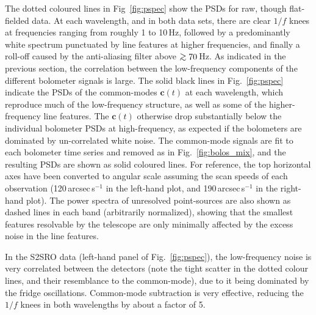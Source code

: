 \documentclass[useAMS,usenatbib,nofootinbib]{mn2e}
\def\gsim{\mathrel{\lower2.5pt\vbox{\lineskip=0pt\baselineskip=0pt
          \hbox{$>$}\hbox{$\sim$}}}}
\begin{document}
The dotted coloured lines in Fig~\ref{fig:pspec} show the PSDs for
raw, though flat-fielded data. At each wavelength, and in both data
sets, there are clear $1/f$ knees at frequencies ranging from roughly
1 to 10\,Hz, followed by a predominantly white spectrum punctuated by
line features at higher frequencies, and finally a roll-off caused by
the anti-aliasing filter above $\gsim 70$\,Hz. As indicated in the
previous section, the correlation between the low-frequency components
of the different bolometer signals is large. The solid black lines in
Fig.~\ref{fig:pspec} indicate the PSDs of the common-modes
$\mathbf{c}(t)$ at each wavelength, which reproduce much of the
low-frequency structure, as well as some of the higher-frequency line
features. The $\mathbf{c}(t)$ otherwise drop substantially below the
individual bolometer PSDs at high-frequency, as expected if the
bolometers are dominated by un-correlated white noise. The common-mode
signals are fit to each bolometer time series and removed as in
Fig.~\ref{fig:bolos_mix}, and the resulting PSDs are shown as solid
coloured lines.  For reference, the top horizontal axes have been
converted to angular scale assuming the scan speeds of each
observation (120\,arcsec\,s$^{-1}$ in the left-hand plot, and
190\,arcsec\,s$^{-1}$ in the right-hand plot). The power spectra of
unresolved point-sources are also shown as dashed lines in each band
(arbitrarily normalized), showing that the smallest features
resolvable by the telescope are only minimally affected by the excess
noise in the line features.

In the S2SRO data (left-hand panel of Fig.~\ref{fig:pspec}), the
low-frequency noise is very correlated between the detectors (note the
tight scatter in the dotted colour lines, and their resemblance to the
common-mode), due to it being dominated by the fridge
oscillations. Common-mode subtraction is very effective, reducing the
$1/f$ knees in both wavelengths by about a factor of 5.
\end{document}
